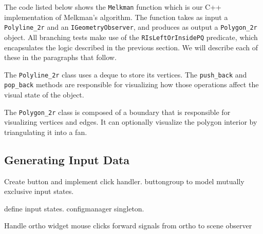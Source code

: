 The code listed below shows the \texttt{Melkman} function which is our C++
implementation of Melkman's algorithm. The function takes as input a
\texttt{Polyline\_2r} and an \texttt{IGeometryObserver}, and produces as output
a \texttt{Polygon\_2r} object. All branching tests make use of the
\texttt{RIsLeftOrInsidePQ} predicate, which encapsulates the logic described in
the previous section. We will describe each of these in the paragraphs that
follow.
 
 

The \texttt{Polyline\_2r} class uses a deque to store its vertices. The
\texttt{push\_back} and \texttt{pop\_back} methods are responsible for
visualizing how those operations affect the visual state of the object.





The \texttt{Polygon\_2r} class is composed of a  boundary
that is responsible for visualizing vertices and edges. It can optionally
visualize the polygon interior by triangulating it into a fan.  

  
 
\subsection{Generating Input Data} 

Create button and implement click handler. buttongroup to model mutually
exclusive input states.

define input states. configmanager singleton. 


Handle ortho widget mouse clicks
forward signals from ortho to scene observer




% 
% 
% 
% 
% 
